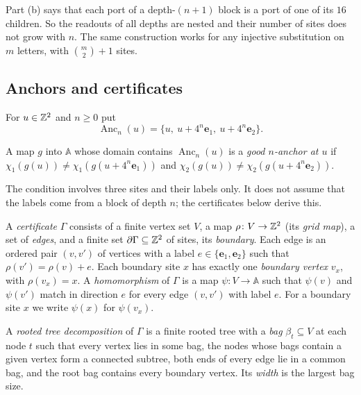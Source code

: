 Part (b) says that each port of a depth-$(n+1)$ block is a port of one of its $16$ children. So the readouts of all depths are nested and their number of sites does not grow with $n$. The same construction works for any injective substitution on $m$ letters, with $\binom m2+1$ sites.

\subsection{Anchors and certificates}\label{scf:sub-parser}

For $u\in\mathbb{Z}^2$ and $n\ge0$ put
\[
\operatorname{Anc}_n(u)=\{u,\ u+4^n\mathbf e_1,\ u+4^n\mathbf e_2\}.
\]

\begin{definition}[Anchors]\label{scf:def-anchor}
A map $g$ into $\mathbb A$ whose domain contains $\operatorname{Anc}_n(u)$ is a \emph{good $n$-anchor at $u$} if $\chi_1(g(u))\ne\chi_1(g(u+4^n\mathbf e_1))$ and $\chi_2(g(u))\ne\chi_2(g(u+4^n\mathbf e_2))$.
\end{definition}

The condition involves three sites and their labels only. It does not assume that the labels come from a block of depth $n$; the certificates below derive this.

\begin{definition}[Certificates]\label{scf:def-cert}
A \emph{certificate} $\Gamma$ consists of a finite vertex set $V$, a map $\rho\colon V\to\mathbb{Z}^2$ (its \emph{grid map}), a set of \emph{edges}, and a finite set $\partial\Gamma\subseteq\mathbb{Z}^2$ of sites, its \emph{boundary}. Each edge is an ordered pair $(v,v')$ of vertices with a label $e\in\{\mathbf e_1,\mathbf e_2\}$ such that $\rho(v')=\rho(v)+e$. Each boundary site $x$ has exactly one \emph{boundary vertex} $v_x$, with $\rho(v_x)=x$. A \emph{homomorphism} of $\Gamma$ is a map $\psi\colon V\to\mathbb A$ such that $\psi(v)$ and $\psi(v')$ match in direction $e$ for every edge $(v,v')$ with label $e$. For a boundary site $x$ we write $\psi(x)$ for $\psi(v_x)$.

A \emph{rooted tree decomposition} of $\Gamma$ is a finite rooted tree with a \emph{bag} $\beta_t\subseteq V$ at each node $t$ such that every vertex lies in some bag, the nodes whose bags contain a given vertex form a connected subtree, both ends of every edge lie in a common bag, and the root bag contains every boundary vertex. Its \emph{width} is the largest bag size.
\end{definition}

